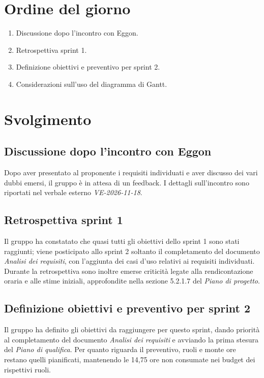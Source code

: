 \documentclass[interno]{gpt}
\begin{document}
\section{Ordine del giorno}
\begin{enumerate}
  \item Discussione dopo l'incontro con Eggon.
  \item Retrospettiva sprint 1.
  \item Definizione obiettivi e preventivo per sprint 2.
  \item Considerazioni sull'uso del diagramma di Gantt.
\end{enumerate}

\clearpage

\section{Svolgimento}

\subsection{Discussione dopo l'incontro con Eggon}
Dopo aver presentato al proponente i requisiti individuati e aver discusso dei vari dubbi emersi, il gruppo è in attesa di un feedback. I dettagli sull'incontro sono riportati nel verbale esterno \textit{VE-2026-11-18}.

\subsection{Retrospettiva sprint 1}
Il gruppo ha constatato che quasi tutti gli obiettivi dello sprint 1 sono stati raggiunti; viene posticipato allo sprint 2 soltanto il completamento del documento \textit{Analisi dei requisiti}, con l'aggiunta dei casi d'uso relativi ai requisiti individuati. Durante la retrospettiva sono inoltre emerse criticità legate alla rendicontazione oraria e alle stime iniziali, approfondite nella sezione 5.2.1.7 del \textit{Piano di progetto}.

\subsection{Definizione obiettivi e preventivo per sprint 2}
Il gruppo ha definito gli obiettivi da raggiungere per questo sprint, dando priorità al completamento del documento \textit{Analisi dei requisiti} e avviando la prima stesura del \textit{Piano di qualifica}. Per quanto riguarda il preventivo, ruoli e monte ore restano quelli pianificati, mantenendo le 14,75 ore non consumate nei budget dei rispettivi ruoli.
\end{document}
